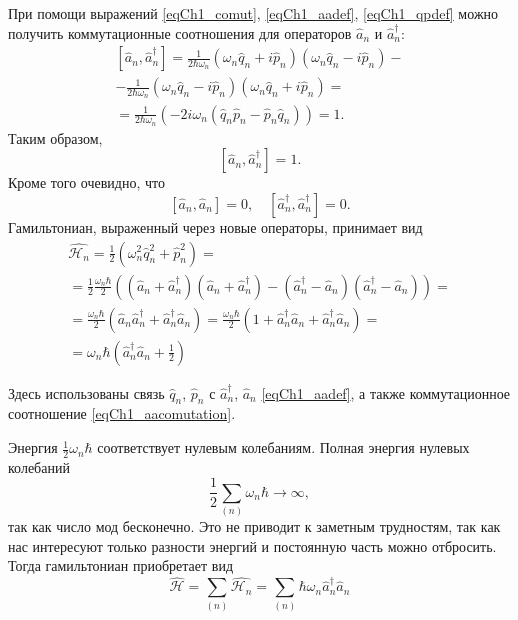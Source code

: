 При помощи выражений \eqref{eqCh1_comut}, 
\eqref{eqCh1_aadef}, \eqref{eqCh1_qpdef} можно получить коммутационные
соотношения для операторов $\hat{a}_n$ и $\hat{a}_n^{\dag}$: 
\begin{eqnarray}
\left[\hat{a}_n, \hat{a}_n^{\dag}\right] = 
\frac{1}{2 \hbar \omega_n}
\left( \omega_n \hat{q}_n + i \hat{p}_n\right) 
\left( \omega_n \hat{q}_n - i \hat{p}_n\right) - 
\nonumber \\
- \frac{1}{2 \hbar \omega_n}
\left( \omega_n \hat{q}_n - i \hat{p}_n\right) 
\left( \omega_n \hat{q}_n + i \hat{p}_n\right) =
\nonumber \\
= \frac{1}{2 \hbar \omega_n}
\left( - 2 i \omega_n 
\left(\hat{q}_n \hat{p}_n - \hat{p}_n \hat{q}_n\right)\right) = 1.
\end{eqnarray}
Таким образом,
\begin{equation}
\left[\hat{a}_n, \hat{a}_n^{\dag}\right] = 1.
\label{eqCh1_aacomutation}
\end{equation}
Кроме того очевидно, что
\begin{equation}
\left[\hat{a}_n, \hat{a}_n\right] = 0,
\quad
\left[\hat{a}_n^{\dag}, \hat{a}_n^{\dag}\right] = 0.
\end{equation}
Гамильтониан, выраженный через новые операторы, принимает вид
\begin{eqnarray}
\hat{\mathcal{H}_n} = 
\frac{1}{2}\left(\omega_n^2 \hat{q}_n^2 + \hat{p}_n^2\right) = 
\nonumber \\
= \frac{1}{2}\frac{\omega_n \hbar}{2}
\left(
\left(\hat{a}_n + \hat{a}_n^{\dag} \right)
\left(\hat{a}_n + \hat{a}_n^{\dag} \right)
-
\left(\hat{a}_n^{\dag} - \hat{a}_n \right)
\left(\hat{a}_n^{\dag} - \hat{a}_n \right)
\right) =
\nonumber \\
= \frac{\omega_n \hbar}{2} 
\left( \hat{a}_n \hat{a}_n^{\dag} + \hat{a}_n^{\dag} \hat{a}_n\right) =
\frac{\omega_n \hbar}{2} 
\left(1 + \hat{a}_n^{\dag} \hat{a}_n + \hat{a}_n^{\dag} \hat{a}_n\right) =
\nonumber \\
= \omega_n \hbar 
\left(\hat{a}_n^{\dag} \hat{a}_n + \frac{1}{2}\right)
\label{eqCh1_quant_stoyachie_volny}
\end{eqnarray}


Здесь использованы связь  $\hat{q}_n$, $\hat{p}_n$ 
с $\hat{a}_n^{\dag}$, $\hat{a}_n$ \eqref{eqCh1_aadef}, а также
коммутационное соотношение \eqref{eqCh1_aacomutation}. 

Энергия $\frac{1}{2}\omega_n \hbar$ соответствует нулевым
колебаниям. Полная энергия нулевых колебаний
\[
\frac{1}{2}\sum_{(n)}\omega_n \hbar \to \infty,
\] 
так как число мод бесконечно. Это не приводит к 
заметным трудностям, так как нас интересуют только разности
энергий и постоянную часть можно отбросить. Тогда гамильтониан
приобретает вид 
\begin{equation}
\hat{\mathcal{H}} = \sum_{(n)}\hat{\mathcal{H}_n} =
\sum_{(n)}\hbar \omega_n \hat{a}_n^{\dag}\hat{a}_n
\end{equation}

